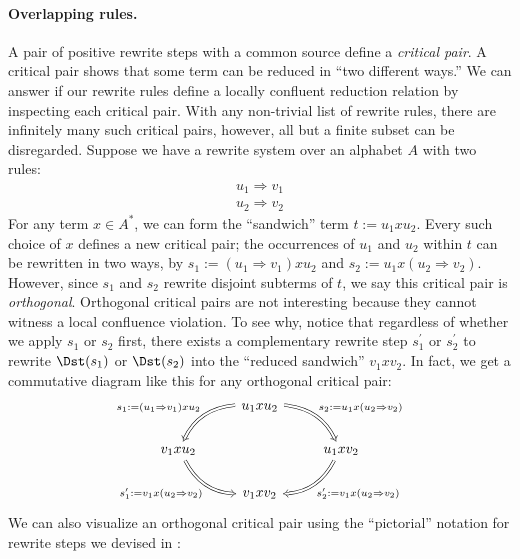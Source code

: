 \documentclass[../generics]{subfiles}
\begin{document}
\paragraph{Overlapping rules.} A pair of positive rewrite steps with a common source define a \emph{critical pair}. A critical pair shows that some term can be reduced in ``two different ways.'' We can answer if our rewrite rules define a locally confluent reduction relation by inspecting each critical pair. With any non-trivial list of rewrite rules, there are infinitely many such critical pairs, however, all but a finite subset can be disregarded. Suppose we have a rewrite system over an alphabet $A$ with two rules:
\begin{gather*}
u_1\Rightarrow v_1\\
u_2\Rightarrow v_2
\end{gather*}
For any term $x\in A^*$, we can form the ``sandwich'' term $t := u_1xu_2$. Every such choice of $x$ defines a new critical pair; the occurrences of $u_1$ and $u_2$ within $t$ can be rewritten in two ways, by $s_1 := (u_1\Rightarrow v_1)xu_2$ and $s_2 := u_1x(u_2\Rightarrow v_2)$. However, since $s_1$ and $s_2$ rewrite disjoint subterms of $t$, we say this critical pair is \emph{orthogonal}. Orthogonal critical pairs are not interesting because they cannot witness a local confluence violation. To see why, notice that regardless of whether we apply $s_1$ or $s_2$ first, there exists a complementary rewrite step $s_1^\prime$ or $s_2^\prime$ to rewrite $\Dst(s_1)$ or $\Dst(s_2)$ into the ``reduced sandwich'' $v_1xv_2$. In fact, we get a commutative diagram like this for any orthogonal critical pair:
\[
\begin{tikzcd}
&u_1xu_2\arrow[ld, Rightarrow, "s_1:=(u_1\Rightarrow v_1)xu_2"', bend right]\arrow[rd, Rightarrow, "s_2:=u_1x(u_2\Rightarrow v_2)", bend left]\\
v_1xu_2\arrow[rd, Rightarrow, "s_1^\prime := v_1x(u_2\Rightarrow v_2)"', bend right]&&u_1xv_2\arrow[ld, Rightarrow, "s_2^\prime:=v_1x(u_2\Rightarrow v_2)", bend left]\\
&v_1xv_2
\end{tikzcd}
\]
We can also visualize an orthogonal critical pair using the ``pictorial'' notation for rewrite steps we devised in :
\end{document}
